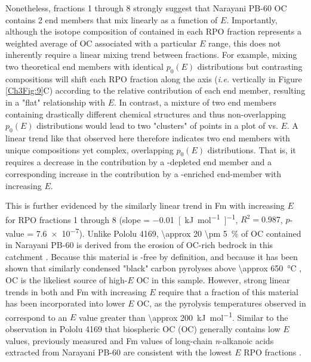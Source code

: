 Nonetheless, fractions 1 through 8 strongly suggest that Narayani PB-60 OC contains 2 end members that mix linearly as a function of $E$. Importantly, although the isotope composition of  contained in each RPO fraction represents a weighted average of OC associated with a particular $E$ range, this does not inherently require a linear mixing trend between fractions. For example, mixing two theoretical end members with identical $p_{0}(E)$ distributions but contrasting  compositions will shift each RPO fraction along the  axis (\textit{i.e.} vertically in Figure \ref{Ch3Fig:9}C) according to the relative contribution of each end member, resulting in a "flat"  relationship with $E$. In contrast, a mixture of two end members containing drastically different chemical structures and thus non-overlapping $p_{0}(E)$ distributions would lead to two "clusters" of points in a plot of  vs. $E$. A linear trend like that observed here therefore indicates two end members with unique  compositions yet complex, overlapping $p_{0}(E)$ distributions. That is, it requires a decrease in the contribution by a -depleted end member and a corresponding increase in the contribution by a -enriched end-member with increasing $E$. 

This is further evidenced by the similarly linear trend in Fm with increasing $E$ for RPO fractions 1 through 8 (slope = \SI{-0.01}{[kJ.mol^{-1}]^{-1}}, $R^{2} = 0.987$, $p$-value = \num{7.6e-7}). Unlike Pololu 4169, \SI{\approx 20 \pm 5}{\%} of OC contained in Narayani PB-60 is derived from the erosion of OC-rich bedrock in this catchment \citep[OC;][]{Galy:2008ff,Rosenheim:2012kh}. Because this material is -free by definition, and because it has been shown that similarly condensed "black" carbon pyrolyses above \SI{\approx 650}{\celsius} \citep{Williams:2014bq}, OC is the likeliest source of high-$E$ OC in this sample. However, strong linear trends in both  and Fm with increasing $E$ require that a fraction of this material has been incorporated into lower $E$ OC, as the pyrolysis temperatures observed in \citet{Williams:2014bq} correspond to an $E$ value greater than \SI{\approx 200}{kJ.mol^{-1}}. Similar to the observation in Pololu 4169 that biospheric OC (OC) generally contains low $E$ values, previously measured  and Fm values of long-chain \textit{n}-alkanoic acids extracted from Narayani PB-60 are consistent with the lowest $E$ RPO fractions \citep[Figure \ref{Ch3Fig:9}C--D;][]{Galy:2011hk,Galy:2011ix}. 

